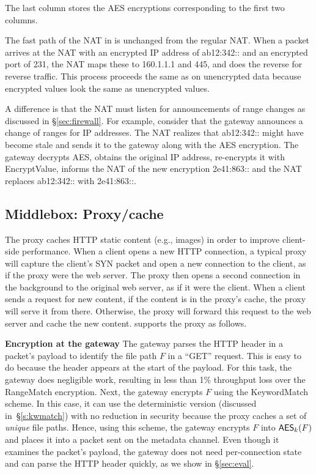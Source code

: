 The last column stores the AES encryptions corresponding to the first two columns. 

The fast path of the NAT in \sys{} is unchanged from the regular NAT. 
When a packet arrives at the NAT with an encrypted   IP address of ab12:342:: and an encrypted port of 231, the NAT maps these to 160.1.1.1 and 445, and does the reverse for reverse traffic. 
This process proceeds the same as on unencrypted data because encrypted values look the same as unencrypted values. 


A difference is that the NAT must listen for announcements of range changes as discussed in \S\ref{sec:firewall}.
For example, consider that the gateway announces a change of ranges for IP addresses.
The NAT realizes that ab12:342:: might have become stale and sends it to the gateway along with the AES encryption. The gateway decrypts AES, obtains the original IP address, re-encrypts it with EncryptValue, informs the NAT of the new encryption 2e41:863:: and the NAT replaces  ab12:342:: with 2e41:863::.


\subsection{Middlebox: Proxy/cache}\label{s:proxy}

The proxy  caches HTTP static content (e.g., images) in order to improve client-side performance. 
When a client opens a new HTTP connection, a typical proxy will capture the client's SYN packet and open a new connection to the client, as if the proxy were the web server. The proxy then opens a second connection in the background to the original web server, as if it were the client. 
When a client sends a request for new content, if the content is in the proxy's cache, the proxy will serve it from there. Otherwise, the proxy will forward this request to the web server and cache the new content. 
\sys supports the proxy as follows. 

\noindent\textbf{Encryption at the gateway} The gateway parses the HTTP header in a packet's payload to identify the file path $F$ in a ``GET'' request. 
This is easy to do because the header appears at the start of the payload. For this task, the gateway does negligible work, resulting in less than 1\% throughput loss over the RangeMatch encryption. 
Next, the gateway encrypts $F$ using the KeywordMatch scheme. In this case, it can use the deterministic version (discussed in~\S\ref{s:kwmatch}) with no reduction in security because the proxy caches a set of {\em unique} file paths. Hence, using this scheme, the gateway encrypts $F$ into $\mathsf{AES}_k(F)$ and places it into a packet sent on the metadata channel. %
Even though it examines the packet's payload, the gateway does not need per-connection state and can parse the HTTP header quickly, as we show in \S\ref{sec:eval}. 

